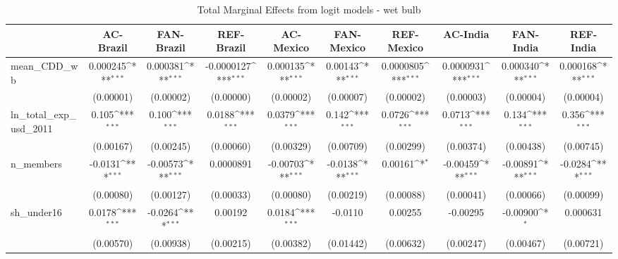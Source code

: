 \begin{table}[htbp]\centering
\def\sym#1{\ifmmode^{#1}\else\(^{#1}\)\fi}
\caption{Total Marginal Effects from logit models - wet bulb}
\begin{tabular}{l*{9}{c}}
\hline\hline
            &\multicolumn{1}{c}{AC-Brazil}&\multicolumn{1}{c}{FAN-Brazil}&\multicolumn{1}{c}{REF-Brazil}&\multicolumn{1}{c}{AC-Mexico}&\multicolumn{1}{c}{FAN-Mexico}&\multicolumn{1}{c}{REF-Mexico}&\multicolumn{1}{c}{AC-India}&\multicolumn{1}{c}{FAN-India}&\multicolumn{1}{c}{REF-India}\\
\hline
mean\_CDD\_wb &    0.000245\sym{***}&    0.000381\sym{***}&  -0.0000127\sym{***}&    0.000135\sym{***}&     0.00143\sym{***}&   0.0000805\sym{***}&   0.0000931\sym{***}&    0.000340\sym{***}&    0.000168\sym{***}\\
            &   (0.00001)         &   (0.00002)         &   (0.00000)         &   (0.00002)         &   (0.00007)         &   (0.00002)         &   (0.00003)         &   (0.00004)         &   (0.00004)         \\
ln\_total\_exp\_usd\_2011&       0.105\sym{***}&       0.100\sym{***}&      0.0188\sym{***}&      0.0379\sym{***}&       0.142\sym{***}&      0.0726\sym{***}&      0.0713\sym{***}&       0.134\sym{***}&       0.356\sym{***}\\
            &   (0.00167)         &   (0.00245)         &   (0.00060)         &   (0.00329)         &   (0.00709)         &   (0.00299)         &   (0.00374)         &   (0.00438)         &   (0.00745)         \\
n\_members   &     -0.0131\sym{***}&    -0.00573\sym{***}&   0.0000891         &    -0.00703\sym{***}&     -0.0138\sym{***}&     0.00161\sym{*}  &    -0.00459\sym{***}&    -0.00891\sym{***}&     -0.0284\sym{***}\\
            &   (0.00080)         &   (0.00127)         &   (0.00033)         &   (0.00080)         &   (0.00219)         &   (0.00088)         &   (0.00041)         &   (0.00066)         &   (0.00099)         \\
sh\_under16  &      0.0178\sym{***}&     -0.0264\sym{***}&     0.00192         &      0.0184\sym{***}&     -0.0110         &     0.00255         &    -0.00295         &    -0.00900\sym{*}  &    0.000631         \\
            &   (0.00570)         &   (0.00938)         &   (0.00215)         &   (0.00382)         &   (0.01442)         &   (0.00632)         &   (0.00247)         &   (0.00467)         &   (0.00721)         \\

\end{tabular}
\end{table}
